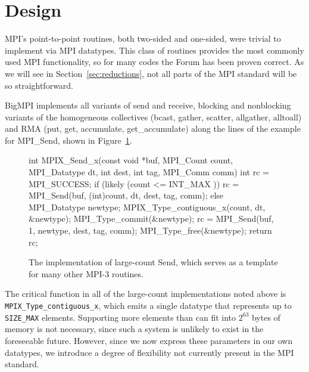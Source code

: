 
\section{Design}


MPI's point-to-point routines, both two-sided and one-sided, were
trivial to implement via MPI datatypes.  This class of routines provides the
most commonly used MPI functionality, so for many codes the Forum has been
proven correct.  As we will see in Section~\ref{sec:reductions},
not all parts of the MPI
standard will be so straightforward.

BigMPI implements all variants of send and receive, blocking and nonblocking variants of
the homogeneous collectives (bcast, gather, scatter, allgather, alltoall)
and RMA (put, get, accumulate, get\_accumulate)
along the lines of the example for MPI\_Send, shown in Figure~\ref{code:mpi_send_x}.

\begin{figure}
\begin{code}
int MPIX_Send_x(const void *buf, MPI_Count count,
                MPI_Datatype dt, int dest,
                int tag, MPI_Comm comm)
{
    int rc = MPI_SUCCESS;
    if (likely (count <= INT_MAX )) {
        rc = MPI_Send(buf, (int)count, dt, dest, tag, comm);
    } else {
        MPI_Datatype newtype;
        MPIX_Type_contiguous_x(count, dt, &newtype);
        MPI_Type_commit(&newtype);
        rc = MPI_Send(buf, 1, newtype, dest, tag, comm);
        MPI_Type_free(&newtype);
    }
    return rc;
}
\end{code}
\label{code:mpi_send_x}
\caption{The implementation of large-count Send, which serves as a template
for many other MPI-3 routines.}
\end{figure}

The critical function in all of the large-count implementations noted above
is \texttt{MPIX\_Type\_contiguous\_x}, which emits a single datatype that
represents up to \texttt{SIZE\_MAX} elements.
Supporting more elements than can fit into $2^{63}$ bytes of memory is
not necessary, since such a system is unlikely to exist in the foreseeable future.
However, since we now express these parameters in our own datatypes, we introduce
a degree of flexibility not currently present in the MPI standard.



